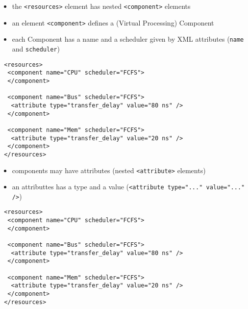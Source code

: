 \begin{frame}[fragile=singleslide]
\begin{itemize}
\item the \lstinline!<resources>! element has nested \lstinline!<component>! elements
\item an element \lstinline!<component>! defines a (Virtual Processing) Component
\item each Component has a name and a scheduler given by XML attributes (\lstinline!name! and \lstinline!scheduler!)
\end{itemize}

\begin{lstlisting}
 <resources>
  <component name="CPU" scheduler="FCFS">
  </component>

  <component name="Bus" scheduler="FCFS">
   <attribute type="transfer_delay" value="80 ns" />
  </component>

  <component name="Mem" scheduler="FCFS">
   <attribute type="transfer_delay" value="20 ns" />
  </component>
 </resources>
\end{lstlisting}
\end{frame}


\begin{frame}[fragile=singleslide]
\begin{itemize}
\item components may have attributes (nested \lstinline!<attribute>! elements)
\item an attributtes has a type and a value (\lstinline!<attribute type="..." value="..." />!)
\end{itemize}

\begin{lstlisting}
 <resources>
  <component name="CPU" scheduler="FCFS">
  </component>

  <component name="Bus" scheduler="FCFS">
   <attribute type="transfer_delay" value="80 ns" />
  </component>

  <component name="Mem" scheduler="FCFS">
   <attribute type="transfer_delay" value="20 ns" />
  </component>
 </resources>
\end{lstlisting}
\end{frame}


